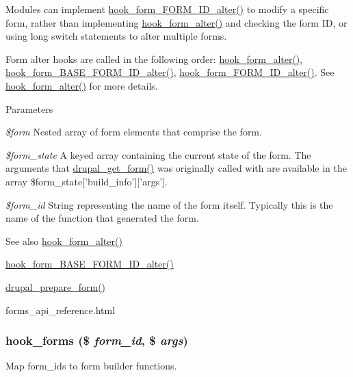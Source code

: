 Modules can implement \hyperlink{group__hooks_ga8d4a4089551493d55911bd5c4f218264}{hook\_\-form\_\-FORM\_\-ID\_\-alter()} to modify a specific form, rather than implementing \hyperlink{group__hooks_ga6df3cea27ae1407aeef4eae5444cb213}{hook\_\-form\_\-alter()} and checking the form ID, or using long switch statements to alter multiple forms.

Form alter hooks are called in the following order: \hyperlink{group__hooks_ga6df3cea27ae1407aeef4eae5444cb213}{hook\_\-form\_\-alter()}, \hyperlink{group__hooks_gaf0cfc224a88c8823da68856c30a4841a}{hook\_\-form\_\-BASE\_\-FORM\_\-ID\_\-alter()}, \hyperlink{group__hooks_ga8d4a4089551493d55911bd5c4f218264}{hook\_\-form\_\-FORM\_\-ID\_\-alter()}. See \hyperlink{group__hooks_ga6df3cea27ae1407aeef4eae5444cb213}{hook\_\-form\_\-alter()} for more details.


\begin{DoxyParams}{Parameters}
\item[{\em \$form}]Nested array of form elements that comprise the form. \item[{\em \$form\_\-state}]A keyed array containing the current state of the form. The arguments that \hyperlink{group__form__api_ga720df81a837b06dfe19daf1c1eea3437}{drupal\_\-get\_\-form()} was originally called with are available in the array \$form\_\-state\mbox{[}'build\_\-info'\mbox{]}\mbox{[}'args'\mbox{]}. \item[{\em \$form\_\-id}]String representing the name of the form itself. Typically this is the name of the function that generated the form.\end{DoxyParams}
\begin{DoxySeeAlso}{See also}
\hyperlink{group__hooks_ga6df3cea27ae1407aeef4eae5444cb213}{hook\_\-form\_\-alter()} 

\hyperlink{group__hooks_gaf0cfc224a88c8823da68856c30a4841a}{hook\_\-form\_\-BASE\_\-FORM\_\-ID\_\-alter()} 

\hyperlink{group__form__api_ga79309515217249c16c7e4a7117141120}{drupal\_\-prepare\_\-form()} 

forms\_\-api\_\-reference.html 
\end{DoxySeeAlso}
\hypertarget{group__hooks_gaa764fee74b85797f75c0c923cad628d5}{
\subsubsection[{hook\_\-forms}]{\setlength{\rightskip}{0pt plus 5cm}hook\_\-forms (\$ {\em form\_\-id}, \/  \$ {\em args})}}
\label{group__hooks_gaa764fee74b85797f75c0c923cad628d5}
Map form\_\-ids to form builder functions.

